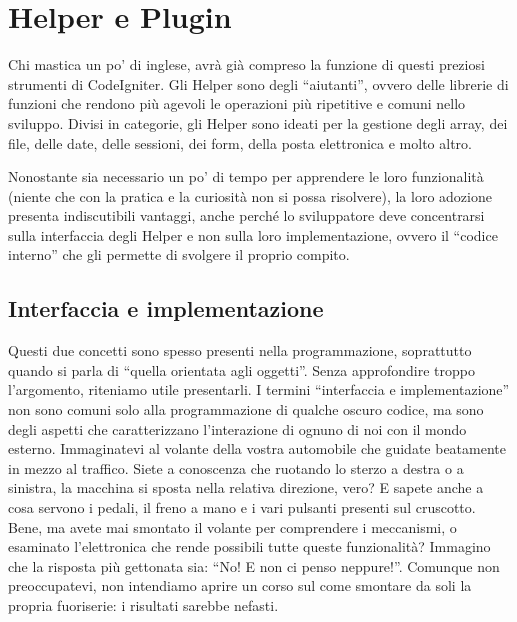\chapter{Helper e Plugin}
\label{cap:helper}

Chi mastica un po' di inglese, avrà già compreso la funzione di questi preziosi strumenti di CodeIgniter. Gli Helper sono degli ``aiutanti'', ovvero delle librerie di funzioni che rendono più agevoli le operazioni più ripetitive e comuni nello sviluppo. Divisi in categorie, gli Helper sono ideati per la gestione degli array, dei file, delle date, delle sessioni, dei form, della posta elettronica e molto altro.

Nonostante sia necessario un po' di tempo per apprendere le loro funzionalità (niente che con la pratica e la curiosità non si possa risolvere), la loro adozione presenta indiscutibili vantaggi, anche perché lo sviluppatore deve concentrarsi sulla interfaccia degli Helper e non sulla loro implementazione, ovvero il ``codice interno'' che gli permette di svolgere il proprio compito.

\section{Interfaccia e implementazione}
Questi due concetti sono spesso presenti nella programmazione, soprattutto quando si parla di ``quella orientata agli oggetti''. Senza approfondire troppo l'argomento, riteniamo utile presentarli. I termini ``interfaccia e implementazione'' non sono comuni solo alla programmazione di qualche oscuro codice, ma sono degli aspetti che caratterizzano l'interazione di ognuno di noi con il mondo esterno. Immaginatevi al volante della vostra automobile che guidate beatamente in mezzo al traffico. Siete a conoscenza che ruotando lo sterzo a destra o a sinistra, la macchina si sposta nella relativa direzione, vero? E sapete anche a cosa servono i pedali, il freno a mano e i vari pulsanti presenti sul cruscotto. Bene, ma avete mai smontato il volante per comprendere i meccanismi, o esaminato l'elettronica che rende possibili tutte queste funzionalità? Immagino che la risposta più gettonata sia: ``No! E non ci penso neppure!''. Comunque non preoccupatevi, non intendiamo aprire un corso sul come smontare da soli la propria fuoriserie: i risultati sarebbe nefasti.

